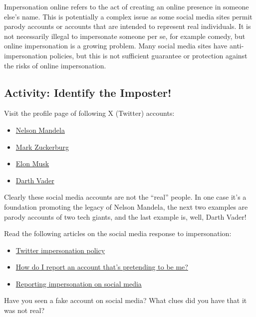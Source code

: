 \documentclass[
]{book}
\providecommand{\tightlist}{%
  \setlength{\itemsep}{0pt}\setlength{\parskip}{0pt}}
\theoremstyle{definition}
\theoremstyle{definition}
\theoremstyle{definition}
\theoremstyle{definition}
\theoremstyle{remark}
\begin{document}
Impersonation online refers to the act of creating an online presence in someone else's name. This is potentially a complex issue as some social media sites permit parody accounts or accounts that are intended to represent real individuals. It is not necessarily illegal to impersonate someone per se, for example comedy, but online impersonation is a growing problem. Many social media sites have anti-impersonation policies, but this is not sufficient guarantee or protection against the risks of online impersonation.

\hypertarget{activity-identify-the-imposter}{%
\subsection*{Activity: Identify the Imposter!}\label{activity-identify-the-imposter}}

\begin{reflect}
Visit the profile page of following X (Twitter) accounts:

\begin{itemize}
\tightlist
\item
  \href{https://twitter.com/NelsonMandela}{Nelson Mandela}\\
\item
  \href{https://twitter.com/notzuckerberg}{Mark Zuckerburg}
\item
  \href{https://twitter.com/ElonMuskAOC}{Elon Musk}
\item
  \href{https://twitter.com/DarthVader}{Darth Vader}
\end{itemize}

Clearly these social media accounts are not the ``real'' people. In one case it's a foundation promoting the legacy of Nelson Mandela, the next two examples are parody accounts of two tech giants, and the last example is, well, Darth Vader!

Read the following articles on the social media response to impersonation:

\begin{itemize}
\tightlist
\item
  \href{https://help.twitter.com/en/rules-and-policies/x-impersonation-and-deceptive-identities-policy}{Twitter impersonation policy}
\item
  \href{https://www.facebook.com/help/174210519303259}{How do I report an account that's pretending to be me?}
\item
  \href{https://saferinternet.org.uk/blog/reporting-impersonation-on-social-media}{Reporting impersonation on social media}
\end{itemize}

Have you seen a fake account on social media? What clues did you have that it was not real?
\end{reflect}
\end{document}
